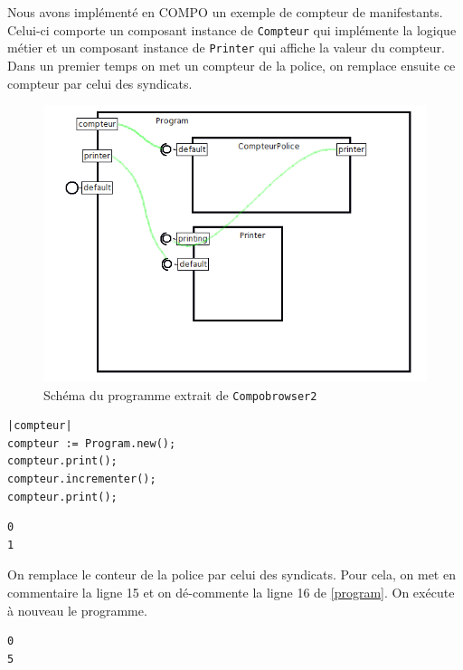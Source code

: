 \documentclass[11pt,a4paper,openany,oneside]{book}
\begin{document}
\begin{appendices}
Nous avons implémenté en COMPO un exemple de compteur de manifestants. Celui-ci comporte un composant instance de \texttt{Compteur} qui implémente la logique métier et un composant instance de \texttt{Printer} qui affiche la valeur du compteur. Dans un premier temps on met un compteur de la police, on remplace ensuite ce compteur par celui des syndicats.

\begin{figure}[H]
\centering
\includegraphics[scale=0.7, keepaspectratio=true]{program}
\caption{Schéma du programme extrait de \texttt{Compobrowser2}}
\label{compteurmanifestant}
\end{figure}

\newpage

\begin{lstlisting}[language=Compo, frame=single, caption=worspace]
|compteur|
compteur := Program.new();
compteur.print();
compteur.incrementer();
compteur.print();
\end{lstlisting}

\begin{lstlisting}[language=Compo, frame=single, caption=output (Avec le \texttt{CompteurPolice})]
0
1
\end{lstlisting}

On remplace le conteur de la police par celui des syndicats. Pour cela, on met en commentaire la ligne 15 et on dé-commente la ligne 16 de \ref{program}. On exécute à nouveau le programme.

\begin{lstlisting}[language=Compo, frame=single, caption=output (Avec le \texttt{CompteurSyndicat})]
0
5
\end{lstlisting}



\end{appendices}
\end{document}
